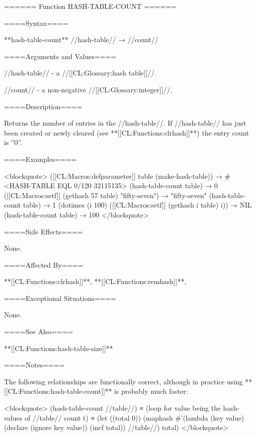 ====== Function HASH-TABLE-COUNT ======

====Syntax====

**hash-table-count** //hash-table// → //count//

====Arguments and Values====

//hash-table// - a //[[CL:Glossary:hash table]]//.

//count// - a non-negative //[[CL:Glossary:integer]]//.

====Description====

Returns the number of entries in the //hash-table//. If //hash-table// has just been created or newly cleared (see **[[CL:Functions:clrhash]]**) the entry count is ''0''.

====Examples====

<blockquote> ([[CL:Macros:defparameter]] table (make-hash-table)) → #<HASH-TABLE EQL 0/120 32115135> (hash-table-count table) → 0 ([[CL:Macros:setf]] (gethash 57 table) "fifty-seven") → "fifty-seven" (hash-table-count table) → 1 (dotimes (i 100) ([[CL:Macros:setf]] (gethash i table) i)) → NIL (hash-table-count table) → 100 </blockquote>

====Side Effects====

None.

====Affected By====

**[[CL:Functions:clrhash]]**, **[[CL:Functions:remhash]]**, 

====Exceptional Situations====

None.

====See Also====

**[[CL:Functions:hash-table-size]]**

====Notes====

The following relationships are functionally correct, although in practice using **[[CL:Functions:hash-table-count]]** is probably much faster:

<blockquote> (hash-table-count //table//) ≡ (loop for value being the hash-values of //table// count t) ≡ (let ((total 0)) (maphash #'(lambda (key value) (declare (ignore key value)) (incf total)) //table//) total) </blockquote>

